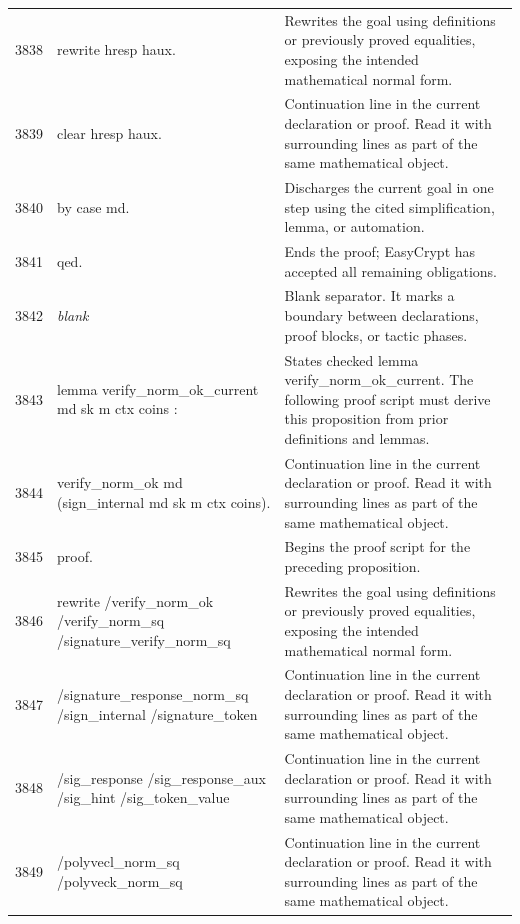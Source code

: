 \documentclass[10pt]{article}
\begin{document}
\begin{longtable}{r L{0.53\textwidth} L{0.37\textwidth}}
3838 & {\ttfamily\scriptsize rewrite hresp haux.} & Rewrites the goal using definitions or previously proved equalities, exposing the intended mathematical normal form. \\
3839 & {\ttfamily\scriptsize clear hresp haux.} & Continuation line in the current declaration or proof.  Read it with surrounding lines as part of the same mathematical object. \\
3840 & {\ttfamily\scriptsize by case md.} & Discharges the current goal in one step using the cited simplification, lemma, or automation. \\
3841 & {\ttfamily\scriptsize qed.} & Ends the proof; EasyCrypt has accepted all remaining obligations. \\
3842 & {\ttfamily\scriptsize \emph{blank}} & Blank separator.  It marks a boundary between declarations, proof blocks, or tactic phases. \\
3843 & {\ttfamily\scriptsize lemma verify\_norm\_ok\_current md sk m ctx coins :} & States checked lemma verify\_norm\_ok\_current.  The following proof script must derive this proposition from prior definitions and lemmas. \\
3844 & {\ttfamily\scriptsize   verify\_norm\_ok md (sign\_internal md sk m ctx coins).} & Continuation line in the current declaration or proof.  Read it with surrounding lines as part of the same mathematical object. \\
3845 & {\ttfamily\scriptsize proof.} & Begins the proof script for the preceding proposition. \\
3846 & {\ttfamily\scriptsize rewrite /verify\_norm\_ok /verify\_norm\_sq /signature\_verify\_norm\_sq} & Rewrites the goal using definitions or previously proved equalities, exposing the intended mathematical normal form. \\
3847 & {\ttfamily\scriptsize         /signature\_response\_norm\_sq /sign\_internal /signature\_token} & Continuation line in the current declaration or proof.  Read it with surrounding lines as part of the same mathematical object. \\
3848 & {\ttfamily\scriptsize         /sig\_response /sig\_response\_aux /sig\_hint /sig\_token\_value} & Continuation line in the current declaration or proof.  Read it with surrounding lines as part of the same mathematical object. \\
3849 & {\ttfamily\scriptsize         /polyvecl\_norm\_sq /polyveck\_norm\_sq} & Continuation line in the current declaration or proof.  Read it with surrounding lines as part of the same mathematical object. \\

\end{longtable}
\end{document}
